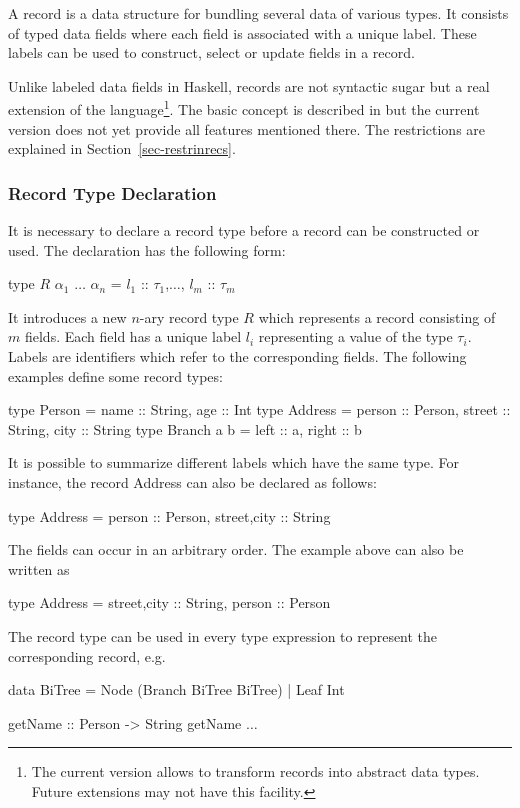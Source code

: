 \documentclass[11pt,fleqn]{article}
\renewcommand{\tt}{\usefont{OT1}{cmtt}{m}{n}\selectfont}
\newcommand{\codefont}{\small\tt}
\newcommand{\code}[1]{\mbox{\codefont #1}}
\begin{document}
A record is a data structure for bundling several data of various types.
It consists of typed data fields where each field is associated with
a unique label. These labels can be used to construct, select or update
fields in a record.


Unlike labeled data fields in Haskell, records are 
not syntactic sugar but a real extension of the
language\footnote{The current version allows to transform records
  into abstract data types. Future extensions may not have
  this facility.}.
The basic concept is described in \cite{Leijen05} but the current
version does not yet provide all features mentioned there. 
The restrictions are explained in Section~\ref{sec-restrinrecs}.
 
\subsubsection{Record Type Declaration}
\label{sec-recordtypedecl}

It is necessary to declare a record type before a record
can be constructed or used. The declaration has the following form:
\begin{curry}
type $R$ $\alpha_1$ $\ldots$ $\alpha_n$ = { $l_1$ :: $\tau_1$,$\ldots$, $l_m$ :: $\tau_m$ }
\end{curry}
It introduces a new $n$-ary record type $R$ which represents a
record consisting of $m$ fields. Each field has a unique label $l_i$ 
representing a value of the type $\tau_i$. Labels
are identifiers which refer to the corresponding
fields. The following examples define some record types:
\begin{curry}
type Person = {name :: String, age :: Int}
type Address = {person :: Person, street :: String, city :: String}
type Branch a b = {left :: a, right :: b}
\end{curry}
It is possible to summarize different labels which have the same
type. For instance, the record \code{Address} can also be declared as follows:
\begin{curry}
type Address = {person :: Person, street,city :: String}
\end{curry}
The fields can occur in an arbitrary order. The example above
can also be written as
\begin{curry}
type Address = {street,city :: String, person :: Person}
\end{curry}
The record type can be used in every type expression to represent
the corresponding record, e.g.
\begin{curry}
data BiTree = Node (Branch BiTree BiTree) | Leaf Int
\end{curry}
\begin{curry}
getName :: Person -> String
getName $\ldots$
\end{curry}
\end{document}
